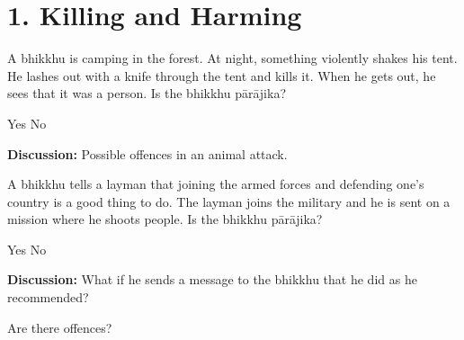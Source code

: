 \chapter{1. Killing and Harming}
\renewcommand*{\theChapterTitle}{1. Killing and Harming}

\begin{exam}{\autoExamName}

\begin{problem*}

  \begin{parts}

  \item A bhikkhu is camping in the forest. At night, something violently shakes
    his tent. He lashes out with a knife through the tent and kills it. When he
    gets out, he sees that it was a person. Is the bhikkhu pārājika?

    \bigskip

    \begin{answers}{2}
      \bChoices
       Yes\eAns
       No\eAns
      \eChoices
    \end{answers}

    \bigskip

    \textbf{Discussion:} Possible offences in an animal attack.

    \bigskip

  \item A bhikkhu tells a layman that joining the armed forces and defending
    one's country is a good thing to do. The layman joins the military and he is
    sent on a mission where he shoots people. Is the bhikkhu pārājika?

    \bigskip

    \begin{answers}{2}
      \bChoices
       Yes\eAns
       No\eAns
      \eChoices
    \end{answers}

    \bigskip

    \textbf{Discussion:} What if he sends a message to the bhikkhu that he did
    as he recommended?

  \end{parts}

\end{problem*}

\begin{problem*}

  Are there offences?

\begin{parts}


\end{parts}
\end{problem*}
\end{exam}

